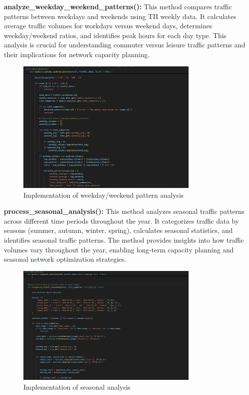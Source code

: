 \documentclass[MScCS]{uccthesis}
\begin{document}
\textbf{analyze\_weekday\_weekend\_patterns():}
This method compares traffic patterns between weekdays and weekends using TII weekly data. It calculates average traffic volumes for workdays versus weekend days, determines weekday/weekend ratios, and identifies peak hours for each day type. This analysis is crucial for understanding commuter versus leisure traffic patterns and their implications for network capacity planning.

\begin{figure}[H]
   \centering
   \includegraphics[width=0.8\textwidth]{Images/analyze_weekday_weekend.png}
   \caption{Implementation of weekday/weekend pattern analysis}
   \label{fig:temporal_weekday_weekend}
\end{figure}

\textbf{process\_seasonal\_analysis():}
This method analyzes seasonal traffic patterns across different time periods throughout the year. It categorizes traffic data by seasons (summer, autumn, winter, spring), calculates seasonal statistics, and identifies seasonal traffic patterns. The method provides insights into how traffic volumes vary throughout the year, enabling long-term capacity planning and seasonal network optimization strategies.

\begin{figure}[H]
   \centering
   \includegraphics[width=0.8\textwidth]{Images/process_seasonal_analysis.png}
   \caption{Implementation of seasonal analysis}
   \label{fig:temporal_seasonal_analysis}
\end{figure}
\end{document}
